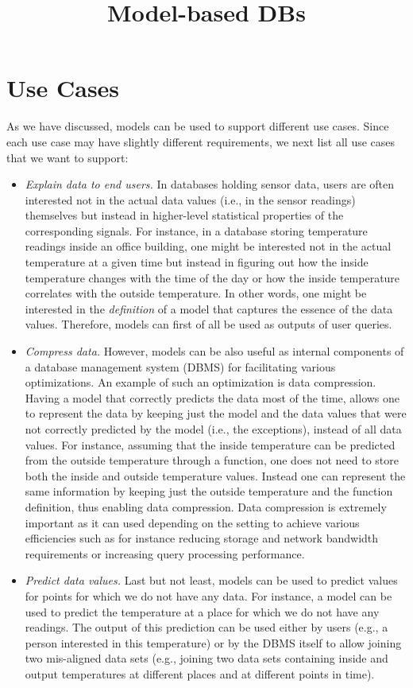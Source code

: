 \documentclass{sig-alternate}
\begin{document}
\title{Model-based DBs}

\maketitle

\section{Use Cases}

As we have discussed, models can be used to support different use cases. Since each use case may have slightly different requirements, we next list all use cases that we want to support:

\begin{itemize}
\item \emph{Explain data to end users.} In databases holding sensor data, users are often interested not in the actual data values (i.e., in the sensor readings) themselves but instead in higher-level statistical properties of the corresponding signals. For instance, in a database storing temperature readings inside an office building, one might be interested not in the actual temperature at a given time but instead in figuring out how the inside temperature changes with the time of the day or how the inside temperature correlates with the outside temperature. In other words, one might be interested in the \emph{definition} of a model that captures the essence of the data values. Therefore, models can first of all be used as outputs of user queries.
%
\item \emph{Compress data.} However, models can be also useful as internal components of a database management system (DBMS) for facilitating various optimizations. An example of such an optimization is data compression. Having a model that correctly predicts the data most of the time, allows one to represent the data by keeping just the model and the data values that were not correctly predicted by the model (i.e., the exceptions), instead of all data values. For instance, assuming that the inside temperature can be predicted from the outside temperature through a function, one does not need to store both the inside and outside temperature values. Instead one can represent the same information by keeping just the outside temperature and the function definition, thus enabling data compression. Data compression is extremely important as it can used depending on the setting to achieve various efficiencies such as for instance reducing storage and network bandwidth requirements or increasing query processing performance.
%
\item \emph{Predict data values.} Last but not least, models can be used to predict values for points for which we do not have any data. For instance, a model can be used to predict the temperature at a place for which we do not have any readings. The output of this prediction can be used either by users (e.g., a person interested in this temperature) or by the DBMS itself to allow joining two mis-aligned data sets (e.g., joining two data sets containing inside and output temperatures at different places and at different points in time).
\end{itemize}
\end{document}

